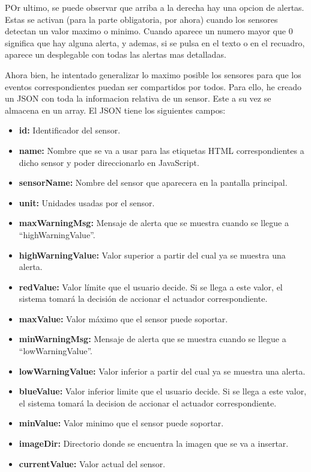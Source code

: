 \documentclass{article}
\begin{document}
POr ultimo, se puede observar que arriba a la derecha hay una opcion de alertas. Estas se activan (para la parte obligatoria, por ahora) cuando los sensores detectan un valor maximo o minimo. Cuando aparece un numero mayor que 0 significa que hay alguna alerta, y ademas, si se pulsa en el texto o en el recuadro, aparece un desplegable con todas las alertas mas detalladas.


Ahora bien, he intentado generalizar lo maximo posible los sensores para que los eventos correspondientes puedan ser compartidos por todos. Para ello, he creado un JSON con toda la informacion relativa de un sensor. Este a su vez se almacena en un array. El JSON tiene los siguientes campos:

\begin{itemize}
    \item \textbf{id: }Identificador del sensor.
    \item \textbf{name: }Nombre que se va a usar para las etiquetas HTML correspondientes a dicho sensor y poder direccionarlo en JavaScript.
    \item \textbf{sensorName: }Nombre del sensor que aparecera en la pantalla principal.
    \item \textbf{unit: }Unidades usadas por el sensor.
    \item \textbf{maxWarningMsg: }Mensaje de alerta que se muestra cuando se llegue a ``highWarningValue''.
    \item \textbf{highWarningValue: }Valor superior a partir del cual ya se muestra una alerta.
    \item \textbf{redValue: }Valor límite que el usuario decide. Si se llega a este valor, el sistema tomará la decisión de accionar el actuador correspondiente.
    \item \textbf{maxValue: }Valor máximo que el sensor puede soportar.
    \item \textbf{minWarningMsg: }Mensaje de alerta que se muestra cuando se llegue a ``lowWarningValue''.
    \item \textbf{lowWarningValue: }Valor inferior a partir del cual ya se muestra una alerta.
    \item \textbf{blueValue: }Valor inferior limite que el usuario decide. Si se llega a este valor, el sistema tomará la decision de accionar el actuador correspondiente.
    \item \textbf{minValue: }Valor minimo que el sensor puede soportar.
    \item \textbf{imageDir: }Directorio donde se encuentra la imagen que se va a insertar.
    \item \textbf{currentValue: }Valor actual del sensor.
\end{itemize}
\end{document}
